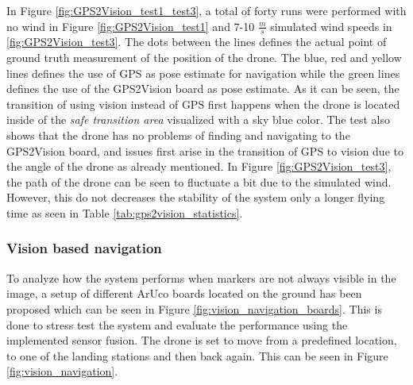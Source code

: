 \documentclass[../Head/report.tex]{subfiles}
\begin{document}
In Figure \ref{fig:GPS2Vision_test1_test3}, a total of forty runs were performed with no wind in Figure \ref{fig:GPS2Vision_test1} and 7-10 $\frac{m}{s}$ simulated wind speeds in \ref{fig:GPS2Vision_test3}. The dots between the lines defines the actual point of ground truth measurement of the position of the drone. The blue, red and yellow lines defines the use of GPS as pose estimate for navigation while the green lines defines the use of the GPS2Vision board as pose estimate. As it can be seen, the
transition of using vision instead of GPS first happens when the drone is located inside of the \textit{safe transition area} visualized with a sky blue color. The test also shows that the drone has no problems of finding and navigating to the GPS2Vision board, and issues first arise in the transition of GPS to vision due to the angle of the drone as already mentioned. In Figure \ref{fig:GPS2Vision_test3}, the path of the drone can be seen to fluctuate a bit due to the simulated wind. However, this do not decreases the stability of the system only a longer flying time as seen in Table \ref{tab:gps2vision_statistics}. 

\subsubsection{Vision based navigation}
\label{sec:vision_based_navigation}

To analyze how the system performs when markers are not always visible in the image, a setup of different ArUco boards located on the ground has been proposed which can be seen in Figure \ref{fig:vision_navigation_boards}. This is done to stress test the system and evaluate the performance using the implemented sensor fusion. The drone is set to move from a predefined location, to one of the landing stations and then back again. This can be seen in Figure \ref{fig:vision_navigation}.  
\end{document}
